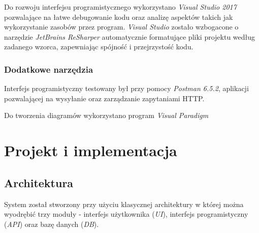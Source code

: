\documentclass[eng,printmode,openany]{mgr}
\begin{document}
	 Do rozwoju interfejsu programistycznego wykorzystano \textit{Visual Studio 2017} pozwalające na łatwe debugowanie kodu oraz analizę aspektów takich jak wykorzystanie zasobów przez program. \textit{Visual Studio} zostało wzbogacone o narzędzie \textit{JetBrains ReSharper} automatycznie formatujące pliki projektu według zadanego wzorca, zapewniając spójność i przejrzystość kodu.
	\subsection{Dodatkowe narzędzia}
	Interfejs programistyczny testowany był przy pomocy \textit{Postman 6.5.2}, aplikacji pozwalającej na wysyłanie oraz zarządzanie zapytaniami HTTP.
	
	Do tworzenia diagramów wykorzystano program \textit{Visual Paradigm}
	
	\newpage
	\chapter{Projekt i implementacja}
	\section{Architektura}
	System został stworzony przy użyciu klasycznej architektury w której można wyodrębić trzy moduły - interfejs użytkownika (\textit{UI}), interfejs programistyczny (\textit{API}) oraz bazę danych (\textit{DB}). 
	
\end{document}
